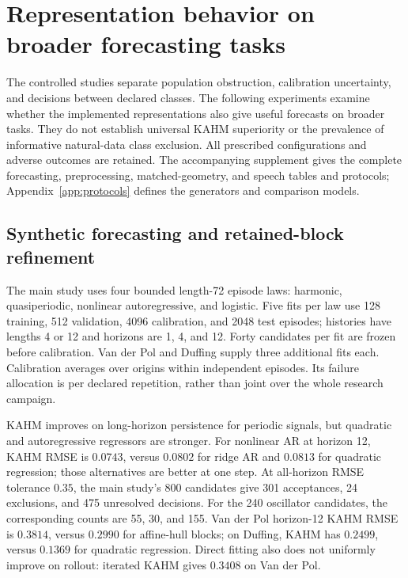 \section{Representation behavior on broader forecasting tasks}
\label{sec:experiments}

The controlled studies separate population obstruction, calibration uncertainty,
and decisions between declared classes. The following experiments examine
whether the implemented representations also give useful forecasts on broader
tasks. They do not establish universal KAHM superiority or the prevalence of
informative natural-data class exclusion. All prescribed configurations and
adverse outcomes are retained. The accompanying supplement gives the complete
forecasting, preprocessing, matched-geometry, and speech tables and protocols;
Appendix~\ref{app:protocols} defines the generators and comparison models.

\subsection{Synthetic forecasting and retained-block refinement}
\label{sec:oscillators}
\label{sec:budget-sensitivity}

The main study uses four bounded length-72 episode laws: harmonic,
quasiperiodic, nonlinear autoregressive, and logistic. Five fits per law use
128 training, 512 validation, 4096 calibration, and 2048 test episodes;
histories have lengths 4 or 12 and horizons are 1, 4, and 12. Forty candidates
per fit are frozen before calibration. Van der Pol and Duffing supply three
additional fits each. Calibration averages over origins within independent
episodes. Its failure allocation is per declared repetition, rather than
joint over the whole research campaign.

KAHM improves on long-horizon persistence for periodic signals, but quadratic
and autoregressive regressors are stronger. For nonlinear AR at horizon 12,
KAHM RMSE is $0.0743$, versus $0.0802$ for ridge AR and $0.0813$ for
quadratic regression; those alternatives are better at one step. At all-horizon
RMSE tolerance $0.35$, the main study's 800 candidates give 301 acceptances,
24 exclusions, and 475 unresolved decisions. For the 240 oscillator candidates,
the corresponding counts are 55, 30, and 155. Van der Pol horizon-12 KAHM
RMSE is $0.3814$, versus $0.2990$ for affine-hull blocks; on Duffing, KAHM
has $0.2499$, versus $0.1369$ for quadratic regression. Direct fitting also
does not uniformly improve on rollout: iterated KAHM gives $0.3408$ on
Van der Pol.


